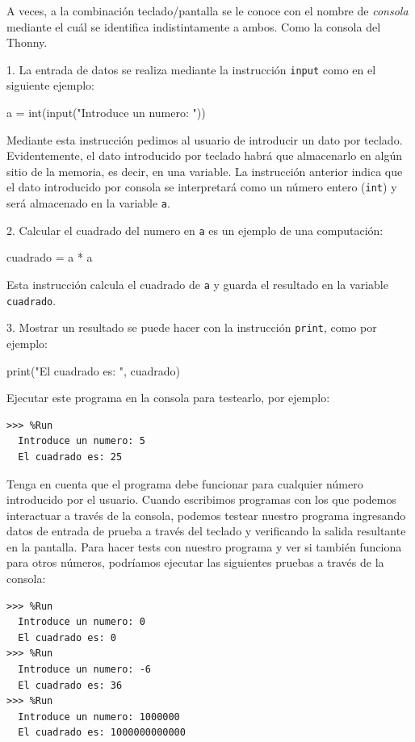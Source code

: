 A veces, a la combinación teclado/pantalla se le conoce
con el nombre de {\em consola} mediante el cuál se identifica
indistintamente a ambos. Como la consola del Thonny.

1. La entrada de datos se realiza mediante la instrucción \verb+input+ como en el  siguiente ejemplo:
\begin{python}[frame=single]
     a = int(input("Introduce un numero: "))
\end{python}
Mediante esta instrucción pedimos al usuario de introducir un dato por teclado. Evidentemente, el dato introducido por teclado habrá que
almacenarlo en algún sitio de la memoria, es decir, en una variable.
La instrucción anterior indica que el dato introducido por consola se
interpretará como un número entero (\verb+int+) y será almacenado en 
la variable \verb+a+.

2. Calcular el cuadrado del numero en \verb+a+ es un ejemplo de una computación:

\begin{python}[frame=single]
     cuadrado = a * a
\end{python}

Esta instrucción calcula el cuadrado de \verb+a+ y guarda el resultado en la variable \verb+cuadrado+.

3. Mostrar un resultado se puede hacer con la instrucción \verb+print+, como por ejemplo:

\begin{python}[frame=single]
     print("El cuadrado es: ", cuadrado)
\end{python}

Ejecutar este programa en la consola para testearlo, por ejemplo:
\begin{Verbatim}[frame=single, label={\em ejemplo de ejecución}]
>>> %Run 
  Introduce un numero: 5
  El cuadrado es: 25
\end{Verbatim}

Tenga en cuenta que el programa debe funcionar para cualquier número introducido por el usuario. Cuando escribimos programas con los que podemos interactuar a través de la consola, podemos testear nuestro programa ingresando datos de entrada de prueba a través del teclado y verificando la salida resultante en la pantalla.
Para hacer tests con nuestro programa y ver si también funciona para otros números, podríamos ejecutar las siguientes pruebas a través de la consola:

\begin{Verbatim}[frame=single, label={\em hacer más tests}]
>>> %Run 
  Introduce un numero: 0
  El cuadrado es: 0
>>> %Run 
  Introduce un numero: -6
  El cuadrado es: 36
>>> %Run 
  Introduce un numero: 1000000
  El cuadrado es: 1000000000000
\end{Verbatim}

